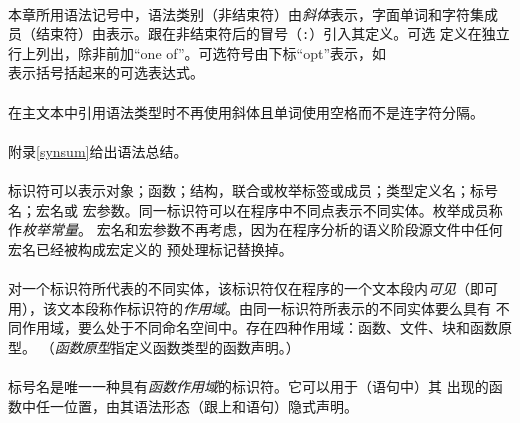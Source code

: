 
\paragraph{}
本章所用语法记号中，语法类别（非结束符）由\textit{斜体}表示，字面单词和字符集成
员（结束符）由表示。跟在非结束符后的冒号（\texttt{:}）引入其定义。可选
定义在独立行上列出，除非前加``one of''。可选符号由下标``opt''表示，如         \\
表示括号括起来的可选表达式。

\paragraph{}
在主文本中引用语法类型时不再使用斜体且单词使用空格而不是连字符分隔。

\paragraph{}
附录\ref{synsum}给出语法总结。


\paragraph{}
标识符可以表示对象；函数；结构，联合或枚举标签或成员；类型定义名；标号名；宏名或
宏参数。同一标识符可以在程序中不同点表示不同实体。枚举成员称作\textit{枚举常量}。
宏名和宏参数不再考虑，因为在程序分析的语义阶段源文件中任何宏名已经被构成宏定义的
预处理标记替换掉。

\paragraph{}
对一个标识符所代表的不同实体，该标识符仅在程序的一个文本段内\textit{可见}（即可
用），该文本段称作标识符的\textit{作用域}。由同一标识符所表示的不同实体要么具有
不同作用域，要么处于不同命名空间中。存在四种作用域：函数、文件、块和函数原型。
（\textit{函数原型}指定义函数类型的函数声明。）

\paragraph{}
标号名是唯一一种具有\textit{函数作用域}的标识符。它可以用于（语句中）其
出现的函数中任一位置，由其语法形态（跟上\tm{:}和语句）隐式声明。

